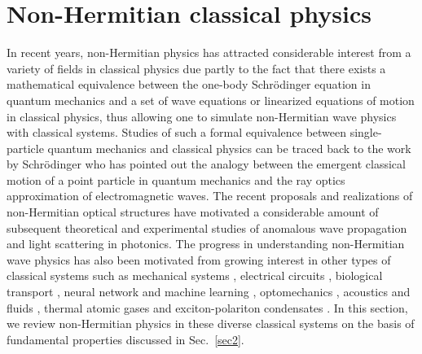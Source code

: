 \documentclass{tADP2e}
\theoremstyle{plain}
\theoremstyle{plain}
\theoremstyle{definition}
\begin{document}
\section{Non-Hermitian classical physics\label{sec3}}
In recent years, non-Hermitian physics has attracted considerable interest from a variety of fields in classical physics due partly to the fact that there exists a mathematical equivalence between the one-body Schr{\"o}dinger equation in quantum mechanics and a set of wave equations or linearized equations of motion in classical physics, thus allowing one to simulate non-Hermitian wave physics with  classical systems. 
Studies of such a formal equivalence between single-particle quantum mechanics and classical physics can be traced back to the work by Schr{\"o}dinger \cite{SE26} who has pointed out the analogy between the emergent classical motion of a point particle in quantum mechanics and the ray optics approximation of electromagnetic waves.
The recent proposals  \cite{AR05,REG07,KGM08,MZH08} and realizations \cite{GA09,RCE10} of non-Hermitian optical structures have motivated a considerable amount of subsequent theoretical and experimental studies of anomalous wave propagation and light scattering in photonics. The progress in understanding non-Hermitian wave physics has also been motivated from growing interest in other types of classical systems such as mechanical systems \cite{KB17}, electrical circuits \cite{CHL18}, biological transport \cite{Chou_2011}, neural network and machine learning \cite{GS08,KG19},  optomechanics \cite{AM14,XH18}, acoustics and fluids \cite{CSA16}, thermal atomic gases \cite{CH17} and exciton-polariton condensates \cite{DH10,Schneider_2016}.
In this section, we review non-Hermitian physics in these diverse classical systems on the basis of fundamental properties discussed in Sec.~\ref{sec2}. 
\end{document}
